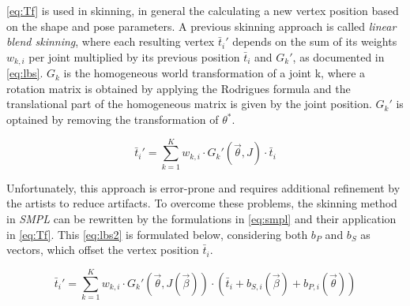 \autoref{eq:Tf} is used in skinning, in general the calculating a new vertex position based on the shape and pose parameters. A previous skinning approach is called \emph{linear blend skinning}, where each resulting vertex $\bar{t}_{i}'$ depends on the sum of its weights $w_{k,i}$ per joint multiplied by its previous position $\bar{t}_{i}$ and $G_{k}'$, as documented in \autoref{eq:lbs}. $G_{k}$ is the homogeneous world transformation of a joint k, where a rotation matrix is obtained by applying the Rodrigues formula and the translational part of the homogeneous matrix is given by the joint position. $G_{k}'$ is optained by removing the transformation of $\theta^{*}$.  

\begin{equation}
\label{eq:lbs}
\bar{t}_{i}' = \sum_{k=1}^{K} w_{k,i} \cdot G_{k}'(\vec{\theta},J) \cdot \bar{t}_{i}
\end{equation}

Unfortunately, this approach is error-prone and requires additional refinement by the artists to reduce artifacts. To overcome these problems, the skinning method in \emph{SMPL} can be rewritten by the formulations in \autoref{eq:smpl} and their application in \autoref{eq:Tf}. This \autoref{eq:lbs2} is formulated below, considering both $b_{P}$ and $b_{S}$ as vectors, which offset the vertex position $\bar{t}_{i}$.

\begin{equation}
\label{eq:lbs2}
\bar{t}_{i}' = \sum_{k=1}^{K} w_{k,i} \cdot G_{k}'(\vec{\theta},J(\vec{\beta})) \cdot (\bar{t}_{i} + b_{S,i}(\vec{\beta}) + b_{P,i}(\vec{\theta}))
\end{equation}
